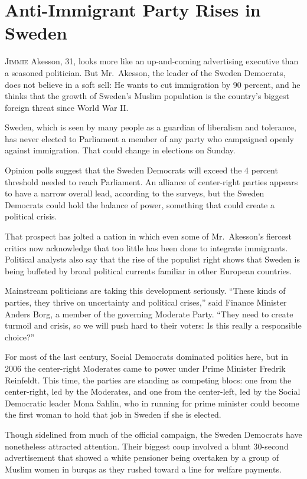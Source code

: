 ﻿\documentclass[12pt]{article}
\begin{document}
\pagebreak
\section{Anti-Immigrant Party Rises in Sweden}

\lettrine{J}{immie} Akesson, 31, looks more like an up-and-coming
advertising executive than a seasoned politician. But Mr.~Akesson, the leader of the Sweden
Democrats, does not believe in a soft sell: He wants to cut immigration by 90 percent, and he thinks
that the growth of Sweden's Muslim population is the country's biggest foreign threat since World
War II.

Sweden, which is seen by many people as a guardian of liberalism and tolerance, has never elected to
Parliament a member of any party who campaigned openly against immigration. That could change in
elections on Sunday.

Opinion polls suggest that the Sweden Democrats will exceed the 4 percent threshold needed to reach
Parliament. An alliance of center-right parties appears to have a narrow overall lead, according to
the surveys, but the Sweden Democrats could hold the balance of power, something that could create a
political crisis.

That prospect has jolted a nation in which even some of Mr.~Akesson's fiercest critics now
acknowledge that too little has been done to integrate immigrants. Political analysts also say that
the rise of the populist right shows that Sweden is being buffeted by broad political currents
familiar in other European countries.

Mainstream politicians are taking this development seriously. ``These kinds of parties, they thrive
on uncertainty and political crises,'' said Finance Minister Anders Borg, a member of the governing
Moderate Party. ``They need to create turmoil and crisis, so we will push hard to their voters: Is
this really a responsible choice?''

For most of the last century, Social Democrats dominated politics here, but in 2006 the center-right
Moderates came to power under Prime Minister Fredrik Reinfeldt. This time, the parties are standing
as competing blocs: one from the center-right, led by the Moderates, and one from the center-left,
led by the Social Democratic leader Mona Sahlin, who in running for prime minister could become the
first woman to hold that job in Sweden if she is elected.

Though sidelined from much of the official campaign, the Sweden Democrats have nonetheless attracted
attention. Their biggest coup involved a blunt 30-second advertisement that showed a white pensioner
being overtaken by a group of Muslim women in burqas as they rushed toward a line for welfare
payments.
\end{document}

